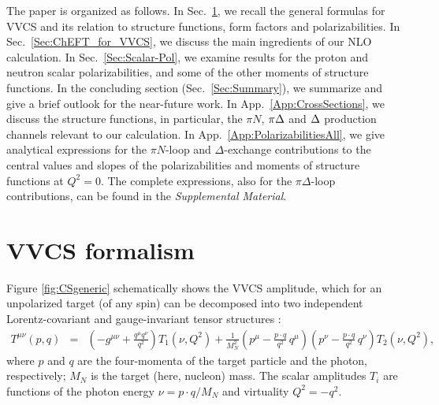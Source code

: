 \documentclass[12pt,preprint,tightenlines,
showpacs,preprintnumbers,amsmath,amssymb,
a4paper,nofootinbib]{revtex4-2}
\def\bea{\begin{eqnarray}}
\def\eea{\end{eqnarray}}
\def\eqlab#1{\label{eq:#1}}
\def\seclab#1{\label{sec:#1}}
\begin{document}
The paper is organized as follows. In Sec.~\ref{sec:LorentzDecomp}, we recall the general formulas for VVCS and its relation to structure functions, form factors and polarizabilities. In Sec.~\ref{Sec:ChEFT_for_VVCS},  we discuss
the main ingredients of our NLO calculation. 
In Sec.~\ref{Sec:Scalar-Pol}, we examine results for the proton and neutron scalar polarizabilities, and some of the other moments
of structure functions.  In the concluding section 
(Sec.\ \ref{Sec:Summary}), we summarize and give a brief outlook
for the near-future work. In App.~\ref{App:CrossSections}, we discuss the structure functions, in particular, the $\pi N$, $\pi \Delta$ and $\Delta$ production channels  
relevant to our calculation. In App.~\ref{App:PolarizabilitiesAll}, 
we give analytical expressions for the $\pi N$-loop and $\Delta$-exchange contributions to the central values and slopes of the polarizabilities and moments of structure functions at $Q^2=0$. The complete expressions, also for the $\pi \Delta$-loop contributions, can be found in the {\it Supplemental Material}.









\section{VVCS formalism} \seclab{LorentzDecomp}

Figure \ref{fig:CSgeneric} schematically shows  the VVCS 
amplitude, which for an unpolarized target  (of any spin) can be decomposed into two
independent Lorentz-covariant and gauge-invariant tensor structures
\cite{Hagelstein:2015egb}:
\bea
\label{Eq:T-Rel}
T^{\mu\nu}(p,q) & = &  
\left( -g^{\mu\nu}+\frac{q^{\mu}q^{\nu}}{q^2}\right)
T_1(\nu, Q^2) +\frac{1}{M_N^2} \left(p^{\mu}-\frac{p\cdot
q}{q^2}\,q^{\mu}\right) \left(p^{\nu}-\frac{p\cdot
q}{q^2}\, q^{\nu} \right) T_2(\nu, Q^2),\quad
\eqlab{fVVCS}
\eea
where $p$ and $q$ are the four-momenta of the target particle and the photon, respectively;
$M_N$ is the target (here, nucleon) mass. 
The scalar amplitudes $T_i$ are functions of the photon
energy $\nu = p\cdot q/ M_N$ and virtuality $Q^2=-q^2$.
\end{document}

